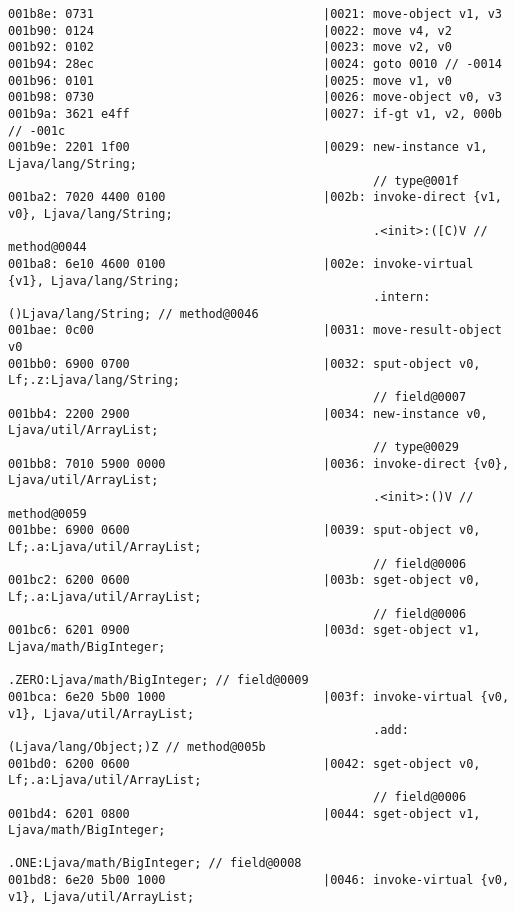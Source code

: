 \begin{lstlisting}
001b8e: 0731                                |0021: move-object v1, v3
001b90: 0124                                |0022: move v4, v2
001b92: 0102                                |0023: move v2, v0
001b94: 28ec                                |0024: goto 0010 // -0014
001b96: 0101                                |0025: move v1, v0
001b98: 0730                                |0026: move-object v0, v3
001b9a: 3621 e4ff                           |0027: if-gt v1, v2, 000b // -001c
001b9e: 2201 1f00                           |0029: new-instance v1, Ljava/lang/String;
                                                   // type@001f
001ba2: 7020 4400 0100                      |002b: invoke-direct {v1, v0}, Ljava/lang/String;
                                                   .<init>:([C)V // method@0044
001ba8: 6e10 4600 0100                      |002e: invoke-virtual {v1}, Ljava/lang/String;
                                                   .intern:()Ljava/lang/String; // method@0046
001bae: 0c00                                |0031: move-result-object v0
001bb0: 6900 0700                           |0032: sput-object v0, Lf;.z:Ljava/lang/String;
                                                   // field@0007
001bb4: 2200 2900                           |0034: new-instance v0, Ljava/util/ArrayList;
                                                   // type@0029
001bb8: 7010 5900 0000                      |0036: invoke-direct {v0}, Ljava/util/ArrayList;
                                                   .<init>:()V // method@0059
001bbe: 6900 0600                           |0039: sput-object v0, Lf;.a:Ljava/util/ArrayList;
                                                   // field@0006
001bc2: 6200 0600                           |003b: sget-object v0, Lf;.a:Ljava/util/ArrayList;
                                                   // field@0006
001bc6: 6201 0900                           |003d: sget-object v1, Ljava/math/BigInteger;
                                                   .ZERO:Ljava/math/BigInteger; // field@0009
001bca: 6e20 5b00 1000                      |003f: invoke-virtual {v0, v1}, Ljava/util/ArrayList;
                                                   .add:(Ljava/lang/Object;)Z // method@005b
001bd0: 6200 0600                           |0042: sget-object v0, Lf;.a:Ljava/util/ArrayList;
                                                   // field@0006
001bd4: 6201 0800                           |0044: sget-object v1, Ljava/math/BigInteger;
                                                   .ONE:Ljava/math/BigInteger; // field@0008
001bd8: 6e20 5b00 1000                      |0046: invoke-virtual {v0, v1}, Ljava/util/ArrayList;

\end{lstlisting}
